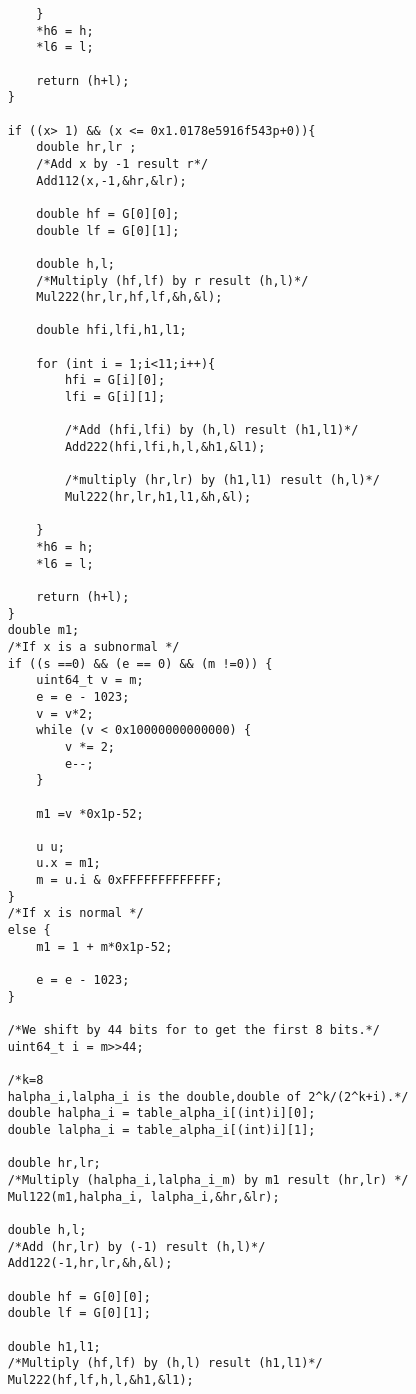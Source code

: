 \begin{lstlisting}
        }
        *h6 = h;
        *l6 = l;
        
        return (h+l);
    }

    if ((x> 1) && (x <= 0x1.0178e5916f543p+0)){
        double hr,lr ;
        /*Add x by -1 result r*/
        Add112(x,-1,&hr,&lr);
       
        double hf = G[0][0];
        double lf = G[0][1];
        
        double h,l;
        /*Multiply (hf,lf) by r result (h,l)*/
        Mul222(hr,lr,hf,lf,&h,&l);
        
        double hfi,lfi,h1,l1;

        for (int i = 1;i<11;i++){
            hfi = G[i][0];
            lfi = G[i][1];

            /*Add (hfi,lfi) by (h,l) result (h1,l1)*/
            Add222(hfi,lfi,h,l,&h1,&l1);

            /*multiply (hr,lr) by (h1,l1) result (h,l)*/
            Mul222(hr,lr,h1,l1,&h,&l);
            
        }
        *h6 = h;
        *l6 = l;
        
        return (h+l);
    }
    double m1;
    /*If x is a subnormal */
    if ((s ==0) && (e == 0) && (m !=0)) {
        uint64_t v = m;
        e = e - 1023;
        v = v*2;
        while (v < 0x10000000000000) {
            v *= 2;
            e--;
        }
        
        m1 =v *0x1p-52;
       
        u u;
        u.x = m1;
        m = u.i & 0xFFFFFFFFFFFFF;
    }
    /*If x is normal */
    else {
        m1 = 1 + m*0x1p-52;
       
        e = e - 1023;
    }

    /*We shift by 44 bits for to get the first 8 bits.*/
    uint64_t i = m>>44;

    /*k=8
    halpha_i,lalpha_i is the double,double of 2^k/(2^k+i).*/
    double halpha_i = table_alpha_i[(int)i][0];
    double lalpha_i = table_alpha_i[(int)i][1];
    
    double hr,lr;
    /*Multiply (halpha_i,lalpha_i_m) by m1 result (hr,lr) */
    Mul122(m1,halpha_i, lalpha_i,&hr,&lr);
    
    double h,l;
    /*Add (hr,lr) by (-1) result (h,l)*/
    Add122(-1,hr,lr,&h,&l);
    
    double hf = G[0][0];
    double lf = G[0][1];

    double h1,l1;
    /*Multiply (hf,lf) by (h,l) result (h1,l1)*/
    Mul222(hf,lf,h,l,&h1,&l1);
    

\end{lstlisting}
